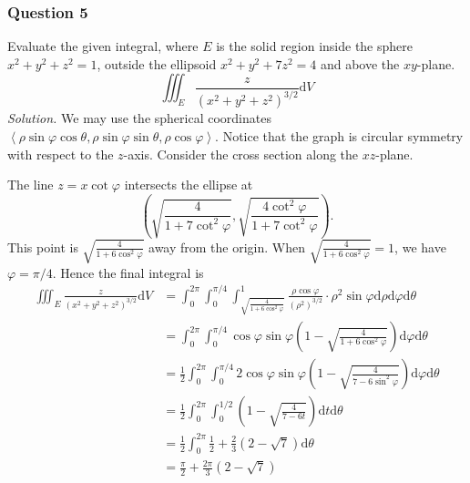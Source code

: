\documentclass[12pt, twoside=false]{scrbook}
\newcommand{\brac}[1]{\left({#1}\right)}
\newcommand{\pvc}[1]{\left\langle {#1} \right\rangle}
\newcounter{a}
\begin{document}
\subsubsection*{Question 5} 
    Evaluate the given integral, where $E$ is the solid region inside the sphere $x^2+y^2+z^2=1$, outside the ellipsoid $x^2+y^2+7z^2=4$ and above the $xy$-plane.
    $$\iiint_E\frac{z}{(x^2+y^2+z^2)^{3/2}}\text{d}V$$
\textit{Solution.} We may use the spherical coordinates $\pvc{\rho\sin\varphi\cos\theta, \rho\sin\varphi\sin\theta, \rho\cos\varphi}$. Notice that the graph is circular symmetry with respect to the $z$-axis. Consider the cross section along the $xz$-plane.
\begin{center}
\end{center}
The line $z=x\cot\varphi$ intersects the ellipse at \[\brac{\sqrt{\frac{4}{1+7\cot^2\varphi}}, \sqrt{\frac{4\cot^2\varphi}{1+7\cot^2\varphi}}}.\] This point is $\sqrt{\frac{4}{1+6\cos^2\varphi}}$ away from the origin. When $\sqrt{\frac{4}{1+6\cos^2\varphi}}=1$, we have $\varphi=\pi/4$. Hence the final integral is 
\begin{align*}
    \iiint_E\frac{z}{(x^2+y^2+z^2)^{3/2}}\text{d}V &= \int_0^{2\pi}\int_0^{\pi/4}\int_{\sqrt{\frac{4}{1+6\cos^2\varphi}}}^1\frac{\rho\cos\varphi}{(\rho^2)^{3/2}}\cdot \rho^2\sin\varphi\text{d}\rho\text{d}\varphi\text{d}\theta\\
    &= \int_0^{2\pi}\int_0^{\pi/4}\cos\varphi\sin\varphi\brac{1-\sqrt{\frac{4}{1+6\cos^2\varphi}}}\text{d}\varphi\text{d}\theta\\
    &= \frac{1}{2}\int_0^{2\pi}\int_0^{\pi/4}2\cos\varphi\sin\varphi\brac{1-\sqrt{\frac{4}{7-6\sin^2\varphi}}}\text{d}\varphi\text{d}\theta\\
    &= \frac{1}{2}\int_0^{2\pi}\int_0^{1/2}\brac{1-\sqrt{\frac{4}{7-6t}}}\text{d}t\text{d}\theta\\
    &= \frac{1}{2}\int_0^{2\pi}\frac{1}{2}+\frac{2}{3}(2-\sqrt{7})\text{d}\theta\\
    &= \frac{\pi}{2}+\frac{2\pi}{3}(2-\sqrt{7})
\end{align*}
\end{document}
